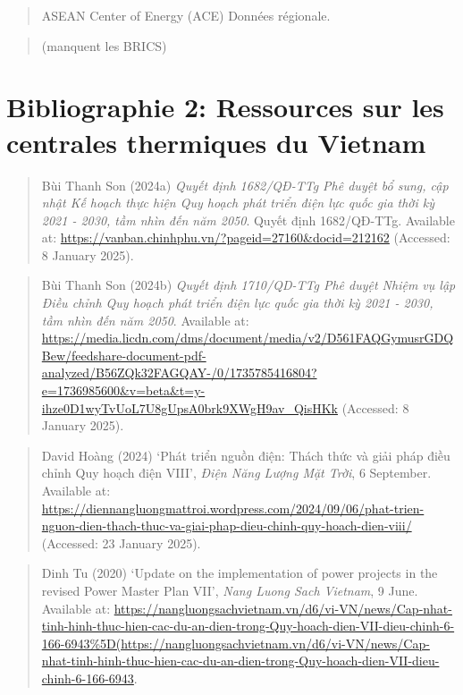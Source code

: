 \documentclass[a4paper,11pt]{report}
\begin{document}
\begin{quote}
ASEAN Center of Energy (ACE) Données régionale.
\end{quote}

\begin{quote}
(manquent les BRICS)
\end{quote}

\chapter{Bibliographie 2: Ressources sur les centrales thermiques du Vietnam}\label{bibliographie-2-ressources-sur-les-centrales-thermiques-du-vietnam}

\begin{quote}
Bùi Thanh Son (2024a) \emph{Quyết định 1682/QĐ-TTg Phê duyệt bổ sung, cập nhật Kế hoạch thực hiện Quy hoạch phát triển điện lực quốc gia thời kỳ 2021 - 2030, tầm nhìn đến năm 2050}. Quyết định 1682/QĐ-TTg. Available at: \url{https://vanban.chinhphu.vn/?pageid=27160\&docid=212162} (Accessed: 8 January 2025).
\end{quote}

\begin{quote}
Bùi Thanh Son (2024b) \emph{Quyết định 1710/QD-TTg Phê duyệt Nhiệm vụ lập Điều chỉnh Quy hoạch phát triển điện lực quốc gia thời kỳ 2021 - 2030, tầm nhìn đến năm 2050}. Available at: \url{https://media.licdn.com/dms/document/media/v2/D561FAQGymusrGDQBew/feedshare-document-pdf-analyzed/B56ZQk32FAGQAY-/0/1735785416804?e=1736985600\&v=beta\&t=y-ihze0D1wyTvUoL7U8gUpsA0brk9XWgH9av_QisHKk} (Accessed: 8 January 2025).
\end{quote}

\begin{quote}
David Hoàng (2024) `Phát triển nguồn điện: Thách thức và giải pháp điều chỉnh Quy hoạch điện VIII', \emph{Điện Năng Lượng Mặt Trời}, 6 September. Available at: \url{https://diennangluongmattroi.wordpress.com/2024/09/06/phat-trien-nguon-dien-thach-thuc-va-giai-phap-dieu-chinh-quy-hoach-dien-viii/} (Accessed: 23 January 2025).
\end{quote}

\begin{quote}
Dinh Tu (2020) `Update on the implementation of power projects in the revised Power Master Plan VII', \emph{Nang Luong Sach Vietnam}, 9 June. Available at: \url{https://nangluongsachvietnam.vn/d6/vi-VN/news/Cap-nhat-tinh-hinh-thuc-hien-cac-du-an-dien-trong-Quy-hoach-dien-VII-dieu-chinh-6-166-6943\%5D(https://nangluongsachvietnam.vn/d6/vi-VN/news/Cap-nhat-tinh-hinh-thuc-hien-cac-du-an-dien-trong-Quy-hoach-dien-VII-dieu-chinh-6-166-6943}.
\end{quote}
\end{document}
